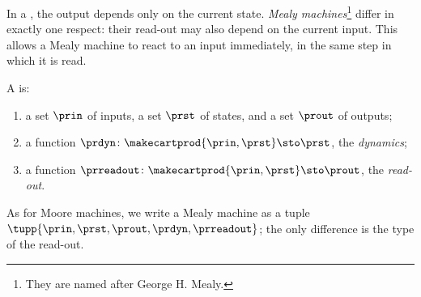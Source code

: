 In a , the output depends only on the current state.
\emph{Mealy machines}\footnote{They are named after George H. Mealy.} differ in exactly one respect: their read-out may also depend on the current input.
This allows a Mealy machine to react to an input immediately, in the same step in which it is read.

\begin{ctdefinition}
    \label{def:mealy-machine}
    A  is:

    \constit
    \begin{enumerate}
        \item a set $\prin$ of inputs, a set $\prst$ of states, and a set $\prout$ of outputs;
        \item a function $\prdyn \colon \makecartprod{\prin, \prst} \sto \prst$, the \emph{dynamics};
        \item a function $\prreadout \colon \makecartprod{\prin, \prst} \sto \prout$, the \emph{read-out}.
    \end{enumerate}
\end{ctdefinition}

As for Moore machines, we write a Mealy machine as a tuple $\tupp{\prin,\prst,\prout,\prdyn,\prreadout}$; the only difference is the type of the read-out.

